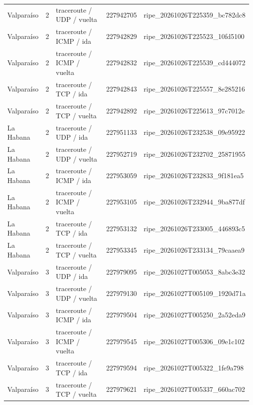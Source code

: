 \begin{longtable}{p{2cm}p{1.15cm}p{4.2cm}p{2.2cm}p{4.95cm}}
Valparaíso & 2 & traceroute / UDP / vuelta & 227942705 & ripe\_\allowbreak{}20261026T225359\_\allowbreak{}bc782dc8 \\
Valparaíso & 2 & traceroute / ICMP / ida & 227942829 & ripe\_\allowbreak{}20261026T225523\_\allowbreak{}10fd5100 \\
Valparaíso & 2 & traceroute / ICMP / vuelta & 227942832 & ripe\_\allowbreak{}20261026T225539\_\allowbreak{}cd444072 \\
Valparaíso & 2 & traceroute / TCP / ida & 227942843 & ripe\_\allowbreak{}20261026T225557\_\allowbreak{}8e285216 \\
Valparaíso & 2 & traceroute / TCP / vuelta & 227942892 & ripe\_\allowbreak{}20261026T225613\_\allowbreak{}97c7012e \\
La Habana & 2 & traceroute / UDP / ida & 227951133 & ripe\_\allowbreak{}20261026T232538\_\allowbreak{}09e95922 \\
La Habana & 2 & traceroute / UDP / vuelta & 227952719 & ripe\_\allowbreak{}20261026T232702\_\allowbreak{}25871955 \\
La Habana & 2 & traceroute / ICMP / ida & 227953059 & ripe\_\allowbreak{}20261026T232833\_\allowbreak{}9f181ea5 \\
La Habana & 2 & traceroute / ICMP / vuelta & 227953105 & ripe\_\allowbreak{}20261026T232944\_\allowbreak{}9ba877df \\
La Habana & 2 & traceroute / TCP / ida & 227953132 & ripe\_\allowbreak{}20261026T233005\_\allowbreak{}446893c5 \\
La Habana & 2 & traceroute / TCP / vuelta & 227953345 & ripe\_\allowbreak{}20261026T233134\_\allowbreak{}79caaea9 \\
Valparaíso & 3 & traceroute / UDP / ida & 227979095 & ripe\_\allowbreak{}20261027T005053\_\allowbreak{}8abc3e32 \\
Valparaíso & 3 & traceroute / UDP / vuelta & 227979130 & ripe\_\allowbreak{}20261027T005109\_\allowbreak{}1920d71a \\
Valparaíso & 3 & traceroute / ICMP / ida & 227979504 & ripe\_\allowbreak{}20261027T005250\_\allowbreak{}2a52eda9 \\
Valparaíso & 3 & traceroute / ICMP / vuelta & 227979545 & ripe\_\allowbreak{}20261027T005306\_\allowbreak{}09e1c102 \\
Valparaíso & 3 & traceroute / TCP / ida & 227979594 & ripe\_\allowbreak{}20261027T005322\_\allowbreak{}1fe9a798 \\
Valparaíso & 3 & traceroute / TCP / vuelta & 227979621 & ripe\_\allowbreak{}20261027T005337\_\allowbreak{}660ac702 \\

\end{longtable}
